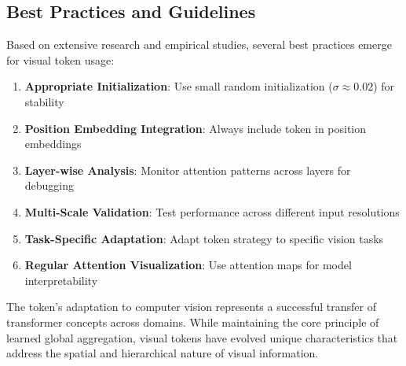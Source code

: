 \subsection{Best Practices and Guidelines}

Based on extensive research and empirical studies, several best practices emerge for visual \cls{} token usage:

\begin{enumerate}
\item \textbf{Appropriate Initialization}: Use small random initialization ($\sigma \approx 0.02$) for stability
\item \textbf{Position Embedding Integration}: Always include \cls{} token in position embeddings
\item \textbf{Layer-wise Analysis}: Monitor attention patterns across layers for debugging
\item \textbf{Multi-Scale Validation}: Test performance across different input resolutions
\item \textbf{Task-Specific Adaptation}: Adapt \cls{} token strategy to specific vision tasks
\item \textbf{Regular Attention Visualization}: Use attention maps for model interpretability
\end{enumerate}
\begin{comment}
Feedback: This list can be made more actionable.
1.  **Appropriate Initialization**: "Stick to the standard small-variance random initialization for the [CLS] token unless you have a strong reason to do otherwise. It's a proven, stable baseline."
2.  **Position Embedding Integration**: "Ensure your position embedding sequence has length N+1 (for N patches), not just N. Forgetting to add a position embedding for the [CLS] token itself is a common and hard-to-debug error."
3.  **Regular Attention Visualization**: "Periodically visualize the [CLS] token's attention maps on a validation set. If the model consistently attends to background patches, it may indicate issues with the training data or that the model is learning spurious correlations."
\end{comment}

The \cls{} token's adaptation to computer vision represents a successful transfer of transformer concepts across domains. While maintaining the core principle of learned global aggregation, visual \cls{} tokens have evolved unique characteristics that address the spatial and hierarchical nature of visual information.